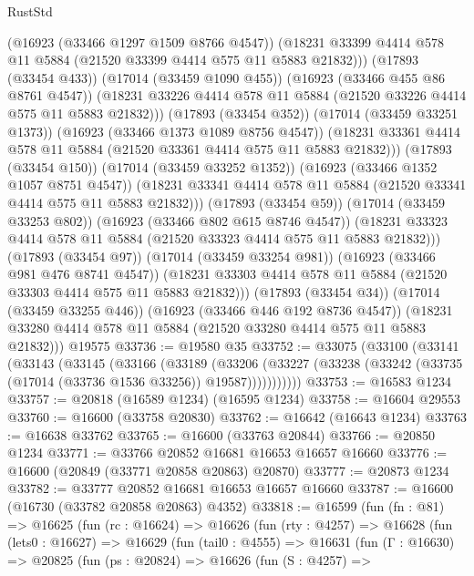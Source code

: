 \begin{lexlean}{RustStd}
\begin{coremodule}
                  (@16923 (@33466 @1297 @1509 @8766 @4547))
                  (@18231 @33399 @4414 @578 @11 @5884 (@21520 @33399 @4414 @575 @11 @5883 @21832)))
                (@17893 (@33454 @433))
                (@17014 (@33459 @1090 @455))
                (@16923 (@33466 @455 @86 @8761 @4547))
                (@18231 @33226 @4414 @578 @11 @5884 (@21520 @33226 @4414 @575 @11 @5883 @21832)))
              (@17893 (@33454 @352))
              (@17014 (@33459 @33251 @1373))
              (@16923 (@33466 @1373 @1089 @8756 @4547))
              (@18231 @33361 @4414 @578 @11 @5884 (@21520 @33361 @4414 @575 @11 @5883 @21832)))
            (@17893 (@33454 @150))
            (@17014 (@33459 @33252 @1352))
            (@16923 (@33466 @1352 @1057 @8751 @4547))
            (@18231 @33341 @4414 @578 @11 @5884 (@21520 @33341 @4414 @575 @11 @5883 @21832)))
          (@17893 (@33454 @59))
          (@17014 (@33459 @33253 @802))
          (@16923 (@33466 @802 @615 @8746 @4547))
          (@18231 @33323 @4414 @578 @11 @5884 (@21520 @33323 @4414 @575 @11 @5883 @21832)))
        (@17893 (@33454 @97))
        (@17014 (@33459 @33254 @981))
        (@16923 (@33466 @981 @476 @8741 @4547))
        (@18231 @33303 @4414 @578 @11 @5884 (@21520 @33303 @4414 @575 @11 @5883 @21832)))
      (@17893 (@33454 @34))
      (@17014 (@33459 @33255 @446))
      (@16923 (@33466 @446 @192 @8736 @4547))
      (@18231 @33280 @4414 @578 @11 @5884 (@21520 @33280 @4414 @575 @11 @5883 @21832)))
    @19575
@33736 := @19580 @35
@33752 := @33075
    (@33100
      (@33141
        (@33143
          (@33145
            (@33166
              (@33189
                (@33206
                  (@33227 (@33238 (@33242 (@33735 (@17014 (@33736 @1536 @33256)) @19587)))))))))))
@33753 := @16583 @1234
@33757 := @20818 (@16589 @1234) (@16595 @1234)
@33758 := @16604 @29553
@33760 := @16600 (@33758 @20830)
@33762 := @16642 (@16643 @1234)
@33763 := @16638 @33762
@33765 := @16600 (@33763 @20844)
@33766 := @20850 @1234
@33771 := @33766 @20852 @16681 @16653 @16657 @16660
@33776 := @16600 (@20849 (@33771 @20858 @20863) @20870)
@33777 := @20873 @1234
@33782 := @33777 @20852 @16681 @16653 @16657 @16660
@33787 := @16600 (@16730 (@33782 @20858 @20863) @4352)
@33818 := @16599
    (fun (fn : @81) =>
    @16625
      (fun (rc : @16624) =>
      @16626
        (fun (rty : @4257) =>
        @16628
          (fun (lets0 : @16627) =>
          @16629
            (fun (tail0 : @4555) =>
            @16631
              (fun (Γ : @16630) =>
              @20825
                (fun (ps : @20824) =>
                @16626
                  (fun (S : @4257) =>

\end{coremodule}
\end{lexlean}
